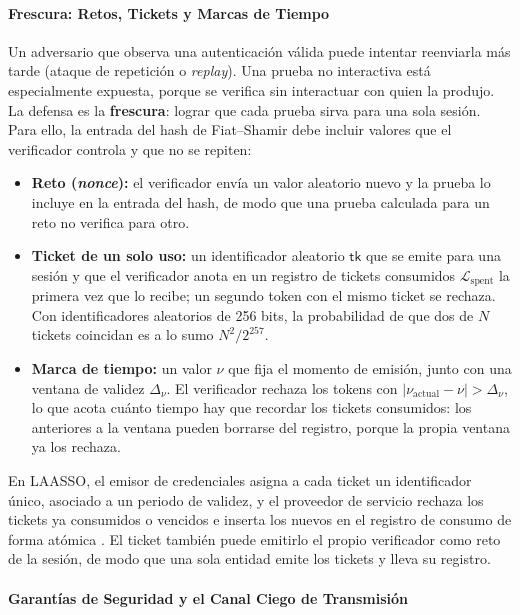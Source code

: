 \paragraph{Frescura: Retos, Tickets y Marcas de Tiempo}
\label{sec:frescura}
Un adversario que observa una autenticación válida puede intentar reenviarla más tarde (ataque de repetición o \textit{replay}). Una prueba no interactiva está especialmente expuesta, porque se verifica sin interactuar con quien la produjo. La defensa es la \textbf{frescura}: lograr que cada prueba sirva para una sola sesión. Para ello, la entrada del hash de Fiat--Shamir debe incluir valores que el verificador controla y que no se repiten:
\begin{itemize}
    \item \textbf{Reto (\textit{nonce}):} el verificador envía un valor aleatorio nuevo y la prueba lo incluye en la entrada del hash, de modo que una prueba calculada para un reto no verifica para otro.
    \item \textbf{Ticket de un solo uso:} un identificador aleatorio $\mathsf{tk}$ que se emite para una sesión y que el verificador anota en un registro de tickets consumidos $\mathcal{L}_{\text{spent}}$ la primera vez que lo recibe; un segundo token con el mismo ticket se rechaza. Con identificadores aleatorios de 256 bits, la probabilidad de que dos de $N$ tickets coincidan es a lo sumo $N^2/2^{257}$.
    \item \textbf{Marca de tiempo:} un valor $\nu$ que fija el momento de emisión, junto con una ventana de validez $\Delta_\nu$. El verificador rechaza los tokens con $|\nu_{\text{actual}} - \nu| > \Delta_\nu$, lo que acota cuánto tiempo hay que recordar los tickets consumidos: los anteriores a la ventana pueden borrarse del registro, porque la propia ventana ya los rechaza.
\end{itemize}
En LAASSO, el emisor de credenciales asigna a cada ticket un identificador único, asociado a un periodo de validez, y el proveedor de servicio rechaza los tickets ya consumidos o vencidos e inserta los nuevos en el registro de consumo de forma atómica \cite{ma2026laasso}. El ticket también puede emitirlo el propio verificador como reto de la sesión, de modo que una sola entidad emite los tickets y lleva su registro.

\paragraph{Garantías de Seguridad y el Canal Ciego de Transmisión}

